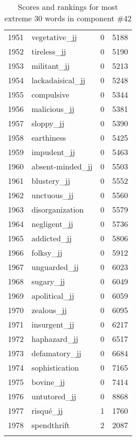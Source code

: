\begin{longtable}[!htbp]{| rlr@{.}l |}
    1951 & vegetative\_jj & 0 & 5188 \\
    1952 & tireless\_jj & 0 & 5190 \\
    1953 & militant\_jj & 0 & 5213 \\
    1954 & lackadaisical\_jj & 0 & 5248 \\
    1955 & compulsive & 0 & 5344 \\
    1956 & malicious\_jj & 0 & 5381 \\
    1957 & sloppy\_jj & 0 & 5390 \\
    1958 & earthiness & 0 & 5425 \\
    1959 & impudent\_jj & 0 & 5463 \\
    1960 & absent-minded\_jj & 0 & 5503 \\
    1961 & blustery\_jj & 0 & 5552 \\
    1962 & unctuous\_jj & 0 & 5560 \\
    1963 & disorganization & 0 & 5579 \\
    1964 & negligent\_jj & 0 & 5736 \\
    1965 & addicted\_jj & 0 & 5806 \\
    1966 & folksy\_jj & 0 & 5912 \\
    1967 & unguarded\_jj & 0 & 6023 \\
    1968 & sugary\_jj & 0 & 6049 \\
    1969 & apolitical\_jj & 0 & 6059 \\
    1970 & zealous\_jj & 0 & 6095 \\
    1971 & insurgent\_jj & 0 & 6217 \\
    1972 & haphazard\_jj & 0 & 6517 \\
    1973 & defamatory\_jj & 0 & 6684 \\
    1974 & sophistication & 0 & 7165 \\
    1975 & bovine\_jj & 0 & 7414 \\
    1976 & untutored\_jj & 0 & 8868 \\
    1977 & risqué\_jj & 1 & 1760 \\
    1978 & spendthrift & 2 & 2087 \\
    \hline
    \caption{Scores and rankings for most extreme 30 words in component \#42} \\
\end{longtable}
